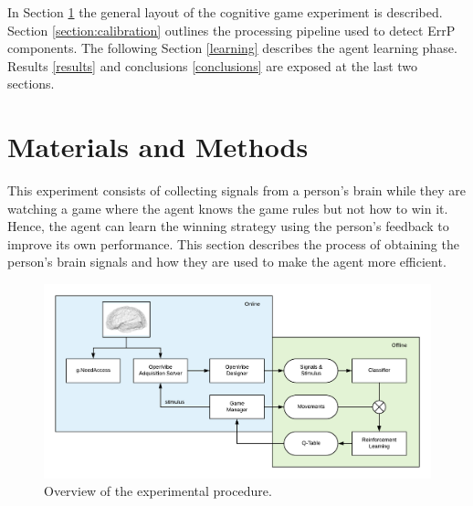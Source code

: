 \documentclass[journal]{IEEEtran}
\begin{document}

In Section \ref{section:materials} the general layout of the cognitive game experiment is described. Section \ref{section:calibration} outlines the processing pipeline used to detect ErrP components. The following Section \ref{learning} describes the agent learning phase.   Results \ref{results} and conclusions \ref{conclusions} are exposed at the last two sections.

\section{Materials and Methods}
\label{section:materials}

This experiment consists of collecting signals from a person's brain while they are watching a game where the agent knows the game rules but not how to win it. Hence, the agent can learn the winning strategy using the person's feedback to improve its own performance. This section describes the process of obtaining the person's brain signals and how they are used to make the agent more efficient.

\begin{figure}[h]
    \centering
    \includegraphics[scale=0.4]{Images/complete_flow.png}
    \caption{Overview of the experimental procedure.}
    \label{diag:complete_flow}
\end{figure}
\end{document}
